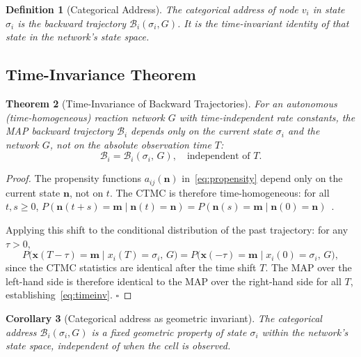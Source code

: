 \documentclass[twocolumn,10pt,a4paper]{article}
\newcommand{\Back}{\mathcal{B}}
\newtheorem{theorem}{Theorem}[section]
\newtheorem{corollary}[theorem]{Corollary}
\newtheorem{definition}[theorem]{Definition}
\begin{document}
\begin{definition}[Categorical Address]
\label{def:cat-address}
The \emph{categorical address} of node $v_i$ in state $\sigma_i$ is the
backward trajectory $\Back_i(\sigma_i,G)$.  It is the time-invariant identity
of that state in the network's state space.
\end{definition}

\subsection{Time-Invariance Theorem}
\label{sec:backward-timeinv}

\begin{theorem}[Time-Invariance of Backward Trajectories]
\label{thm:timeinv}
For an autonomous (time-homogeneous) reaction network $G$ with time-independent
rate constants, the MAP backward trajectory $\Back_i$ depends only on the
current state $\sigma_i$ and the network $G$, not on the absolute observation
time $T$:
\begin{equation}
  \Back_i = \Back_i(\sigma_i,\,G),\quad\text{independent of }T.
  \label{eq:timeinv}
\end{equation}
\end{theorem}

\begin{proof}
The propensity functions $a_{ij}(\mathbf{n})$ in~\eqref{eq:propensity} depend
only on the current state $\mathbf{n}$, not on $t$.  The CTMC is therefore
time-homogeneous: for all $t,s\geq 0$,
$P(\mathbf{n}(t+s)=\mathbf{m}\mid\mathbf{n}(t)=\mathbf{n})=
P(\mathbf{n}(s)=\mathbf{m}\mid\mathbf{n}(0)=\mathbf{n})$~\cite{vanKampen2007}.

Applying this shift to the conditional distribution of the past trajectory:
for any $\tau>0$,
\[
  P\bigl(\mathbf{x}(T-\tau)=\mathbf{m}\mid x_i(T)=\sigma_i,\,G\bigr)
  = P\bigl(\mathbf{x}(-\tau)=\mathbf{m}\mid x_i(0)=\sigma_i,\,G\bigr),
\]
since the CTMC statistics are identical after the time shift $T$.  The MAP
over the left-hand side is therefore identical to the MAP over the right-hand
side for all $T$, establishing~\eqref{eq:timeinv}.  $\square$
\end{proof}

\begin{corollary}[Categorical address as geometric invariant]
\label{cor:geom-inv}
The categorical address $\Back_i(\sigma_i,G)$ is a fixed geometric property
of state $\sigma_i$ within the network's state space, independent of when the
cell is observed.
\end{corollary}
\end{document}
